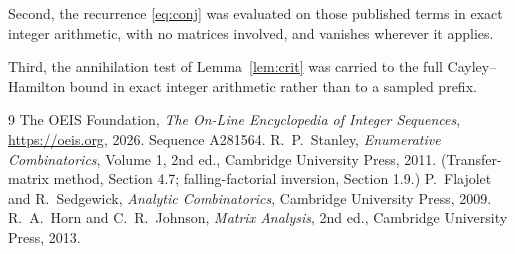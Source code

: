 \documentclass[11pt,a4paper]{article}
\theoremstyle{plain}
\theoremstyle{definition}
\begin{document}
Second, the recurrence \eqref{eq:conj} was evaluated on those published terms in exact
integer arithmetic, with no matrices involved, and vanishes wherever it applies.

Third, the annihilation test of Lemma~\ref{lem:crit} was carried to the full
Cayley--Hamilton bound in exact integer arithmetic rather than to a sampled prefix.

\begin{thebibliography}{9}
 The OEIS Foundation, \emph{The On-Line Encyclopedia of Integer
Sequences}, \url{https://oeis.org}, 2026. Sequence A281564.
 R.~P.~Stanley, \emph{Enumerative Combinatorics}, Volume 1, 2nd ed.,
Cambridge University Press, 2011. (Transfer-matrix method, Section 4.7; falling-factorial
inversion, Section 1.9.)
 P.~Flajolet and R.~Sedgewick, \emph{Analytic Combinatorics}, Cambridge
University Press, 2009.
 R.~A.~Horn and C.~R.~Johnson, \emph{Matrix Analysis}, 2nd ed., Cambridge
University Press, 2013.
\end{thebibliography}
\end{document}
